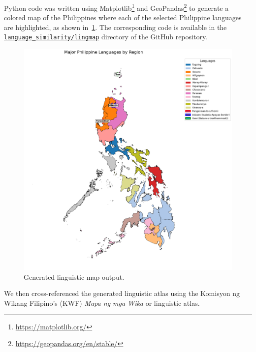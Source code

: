 Python code was written using
Matplotlib\footnote{\url{https://matplotlib.org/}} and
GeoPandas\footnote{\url{https://geopandas.org/en/stable/}} to generate a
colored map of the Philippines where each of the selected Philippine languages
are highlighted, as shown in~\cref{fig:lingmap_out}. The corresponding code is
available in the
\href{https://github.com/zrygan/nlp/tree/master/language_similarity/lingmap}{\texttt{language\_similarity/lingmap}}
directory of the GitHub repository.

\begin{figure}[h]
    \centering
    \includegraphics[width=\columnwidth]{lingmap/artifacts/lingmap_out.png}
    \caption{Generated linguistic map output.}\label{fig:lingmap_out}
\end{figure}

We then cross-referenced the generated linguistic atlas using the Komisyon ng
Wikang Filipino's (KWF) \emph{Mapa ng mga Wika} or linguistic atlas.
